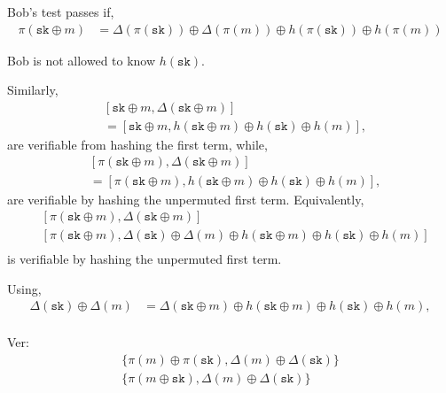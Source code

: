 \documentclass[twocolumn, aps, amsmath, amssymb, nofootinbib, superscriptaddress, longbibliography, doublefloatfix, table-of-contents, eqsecnum, rmp]{revtex4-2}
\begin{document}
Bob's test passes if,
\begin{align}
	\pi(\mathtt{sk} \oplus m) &= \Delta(\pi(\mathtt{sk})) \oplus \Delta(\pi(m)) \oplus h(\pi(\mathtt{sk})) \oplus h(\pi(m))
\end{align}

Bob is not allowed to know $h(\mathtt{sk})$.

Similarly,
\begin{align}
	&[\mathtt{sk} \oplus m, \Delta(\mathtt{sk}\oplus m)] \nonumber\\
	&= [\mathtt{sk} \oplus m, h(\mathtt{sk}\oplus m) \oplus h(\mathtt{sk}) \oplus h(m)],
\end{align}
are verifiable from hashing the first term, while,
\begin{align}
	&[\pi(\mathtt{sk} \oplus m), \Delta(\mathtt{sk}\oplus m)] \nonumber\\
	&= [\pi(\mathtt{sk} \oplus m), h(\mathtt{sk}\oplus m) \oplus h(\mathtt{sk}) \oplus h(m)],
\end{align}
are verifiable by hashing the unpermuted first term. Equivalently,
\begin{align}
	&[\pi(\mathtt{sk} \oplus m), \Delta(\mathtt{sk}\oplus m)] \nonumber\\
	&[\pi(\mathtt{sk} \oplus m), \Delta(\mathtt{sk})\oplus \Delta(m) \oplus h(\mathtt{sk}\oplus m) \oplus h(\mathtt{sk}) \oplus h(m)] \nonumber\\\end{align}
is verifiable by hashing the unpermuted first term.

Using,
\begin{align}
	\Delta(\mathtt{sk}) \oplus \Delta(m) &= \Delta(\mathtt{sk} \oplus m) \oplus h(\mathtt{sk} \oplus m)	\oplus h(\mathtt{sk}) \oplus h(m),\nonumber\\
\end{align}


Ver:
\begin{align}
	\{\pi(m)\oplus \pi(\mathtt{sk}), \Delta(m)\oplus \Delta(\mathtt{sk})\} \nonumber\\
	\{\pi(m\oplus \mathtt{sk}), \Delta(m)\oplus \Delta(\mathtt{sk})\}
\end{align}
\end{document}
